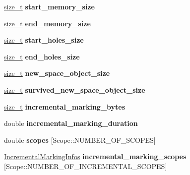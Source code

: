 \begin{DoxyCompactItemize}
\mbox{\hyperlink{classsize__t}{size\+\_\+t}} {\bfseries start\+\_\+memory\+\_\+size}
\item 
\mbox{\label{classv8_1_1internal_1_1GCTracer_1_1Event_acf6257527af8d437023753dee90eded7}} 
\mbox{\hyperlink{classsize__t}{size\+\_\+t}} {\bfseries end\+\_\+memory\+\_\+size}
\item 
\mbox{\label{classv8_1_1internal_1_1GCTracer_1_1Event_a8b97ebad4715cd14fc6fc07a352192e0}} 
\mbox{\hyperlink{classsize__t}{size\+\_\+t}} {\bfseries start\+\_\+holes\+\_\+size}
\item 
\mbox{\label{classv8_1_1internal_1_1GCTracer_1_1Event_aa2c58c0b4b28f1a27955ceebf3cd92c4}} 
\mbox{\hyperlink{classsize__t}{size\+\_\+t}} {\bfseries end\+\_\+holes\+\_\+size}
\item 
\mbox{\label{classv8_1_1internal_1_1GCTracer_1_1Event_a97d12b9c7fbe73ff6fb7dc613c73f51c}} 
\mbox{\hyperlink{classsize__t}{size\+\_\+t}} {\bfseries new\+\_\+space\+\_\+object\+\_\+size}
\item 
\mbox{\label{classv8_1_1internal_1_1GCTracer_1_1Event_aeaa383d7d325d9a86b037465dd03a201}} 
\mbox{\hyperlink{classsize__t}{size\+\_\+t}} {\bfseries survived\+\_\+new\+\_\+space\+\_\+object\+\_\+size}
\item 
\mbox{\label{classv8_1_1internal_1_1GCTracer_1_1Event_a6a3dfe7d606d51e38d907c8a0f4abf5b}} 
\mbox{\hyperlink{classsize__t}{size\+\_\+t}} {\bfseries incremental\+\_\+marking\+\_\+bytes}
\item 
\mbox{\label{classv8_1_1internal_1_1GCTracer_1_1Event_abb2c3827a1615b7e15d0530a7b598679}} 
double {\bfseries incremental\+\_\+marking\+\_\+duration}
\item 
\mbox{\label{classv8_1_1internal_1_1GCTracer_1_1Event_add05c317c9067e4b3d6fce6ce114a802}} 
double {\bfseries scopes} \mbox{[}Scope\+::\+N\+U\+M\+B\+E\+R\+\_\+\+O\+F\+\_\+\+S\+C\+O\+P\+ES\mbox{]}
\item 
\mbox{\label{classv8_1_1internal_1_1GCTracer_1_1Event_ab0685b8ba3ba0372bdac38ba2398c27a}} 
\mbox{\hyperlink{structv8_1_1internal_1_1GCTracer_1_1IncrementalMarkingInfos}{Incremental\+Marking\+Infos}} {\bfseries incremental\+\_\+marking\+\_\+scopes} \mbox{[}Scope\+::\+N\+U\+M\+B\+E\+R\+\_\+\+O\+F\+\_\+\+I\+N\+C\+R\+E\+M\+E\+N\+T\+A\+L\+\_\+\+S\+C\+O\+P\+ES\mbox{]}
\end{DoxyCompactItemize}


